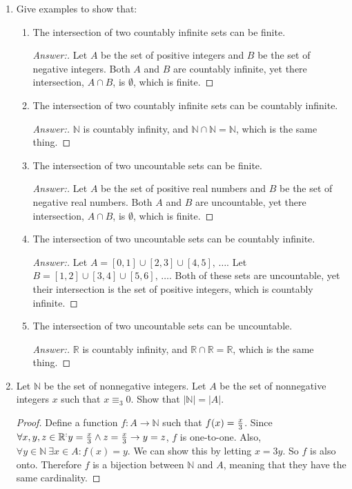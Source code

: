 \documentclass[10pt]{article}
\newcommand{\card}[1]{\left| #1 \right|}
\newcommand{\nat}{\mathbb{N}}
\newcommand{\reals}{\mathbb{R}}
\begin{document}
\begin{enumerate}
\pagebreak
\item
Give examples to show that:
\begin{enumerate}
\item
The intersection of two countably infinite sets can be finite.
\begin{proof}[Answer:]
Let $A$ be the set of positive integers and $B$ be the set of negative integers.  Both $A$ and $B$ are countably infinite, yet there intersection, $A \cap B$, is $\emptyset$, which is finite.
\end{proof}
\item
The intersection of two countably infinite sets can be countably infinite.
\begin{proof}[Answer:]
$\nat$ is countably infinity, and $\nat \cap \nat = \nat$, which is the same thing.
\end{proof}
\item
The intersection of two uncountable sets can be finite.
\begin{proof}[Answer:]
Let $A$ be the set of positive real numbers and $B$ be the set of negative real numbers.  Both $A$ and $B$ are uncountable, yet there intersection, $A \cap B$, is $\emptyset$, which is finite.
\end{proof}
\item
The intersection of two uncountable sets can be countably infinite.
\begin{proof}[Answer:]
Let $A = [0, 1] \cup [2, 3] \cup [4, 5], \, \ldots$.  Let $B = [1, 2] \cup [3, 4] \cup [5, 6], \, \ldots$.  Both of these sets are uncountable, yet their intersection is the set of positive integers, which is countably infinite. 
\end{proof}
\item
The intersection of two uncountable sets can be uncountable.
\begin{proof}[Answer:]
$\reals$ is countably infinity, and $\reals \cap \reals = \reals$, which is the same thing.
\end{proof}
\end{enumerate}



\addtocounter{enumi}{2}
\item
Let $\nat$ be the set of nonnegative integers.  Let $A$ be the set of nonnegative integers $x$ such that $x \equiv _3 0$.  Show that $\card{\nat} = \card{A}$.
\begin{proof}
Define a function $f: A \rightarrow \nat$ such that $f(x) = {x \over 3}$.  Since $\forall x, y, z \in \reals ^: y = {x \over 3} \land z = {x \over 3} \rightarrow y = z$, $f$ is one-to-one.  Also, $\forall y \in \nat \> \exists x \in A: f(x) = y$.  We can show this by letting $x = 3y$.  So $f$ is also onto.  Therefore $f$ is a bijection between $\nat$ and $A$, meaning that they have the same cardinality.
\end{proof}



\end{enumerate}
\end{document}
